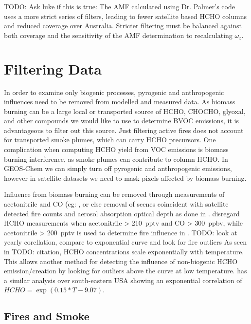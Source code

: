     TODO: Ask luke if this is true:
    The AMF calculated using Dr. Palmer's code uses a more strict series of filters, leading to fewer satellite based HCHO columns and reduced coverage over Australia.
    Stricter filtering must be balanced against both coverage and the sensitivity of the AMF determination to recalculating $\omega_z$.
  

\section{Filtering Data}
  \label{Model:Filter}
  
  In order to examine only biogenic processes, pyrogenic and anthropogenic influences need to be removed from modelled and measured data.
  As biomass burning can be a large local or transported source of HCHO, CHOCHO, glyoxal, and other compounds we would like to use to determine BVOC emissions, it is advantageous to filter out this source.
  Just filtering active fires does not account for transported smoke plumes, which can carry HCHO precursors.
  One complication when computing HCHO yield from VOC emissions is biomass burning interference, as smoke plumes can contribute to column HCHO.
  In GEOS-Chem we can simply turn off pyrogenic and anthropogenic emissions, however in satellite datasets we need to mask pixels affected by biomass burning.
  
  Influence from biomass burning can be removed through measurements of acetonitrile and CO (eg: \parencite{Wolfe2016, Miller2017}, or else removal of scenes coincident with satellite detected fire counts and aerosol absorption optical depth as done in \textcite{Marais2014}.
  \citet{Wolfe2016} disregard HCHO measurements when acetonitrile > 210~pptv and CO > 300~ppbv, while acetonitrile > 200~pptv is used to determine fire influence in \textcite{Miller2017}.
  TODO: look at yearly corellation, compare to exponential curve and look for fire outliers
  As seen in TODO: citation, HCHO concentrations scale exponentially with temperature.
  This allows another method for detecting the influence of non-biogenic HCHO emission/creation by looking for outliers above the curve at low temperature.
  \textcite{Zhu2013_poster} has a similar analysis over south-eastern USA showing an exponential correlation of ${HCHO} = \exp(0.15*{T}-9.07)$.
  
  
  \subsection{Fires and Smoke}
    \label{Model:Filter:fire}
    
